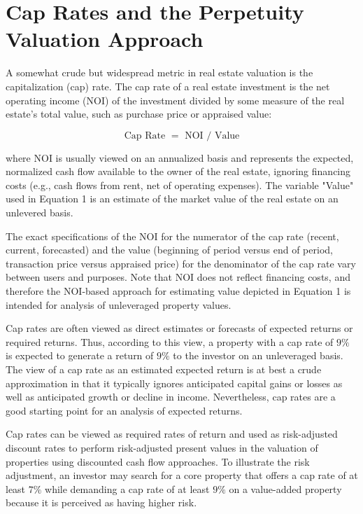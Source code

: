\documentclass[11pt]{article}
\begin{document}
\section*{Cap Rates and the Perpetuity Valuation Approach}
A somewhat crude but widespread metric in real estate valuation is the capitalization (cap) rate. The cap rate of a real estate investment is the net operating income (NOI) of the investment divided by some measure of the real estate's total value, such as purchase price or appraised value:


\begin{equation*}
\text { Cap Rate }=\text { NOI } / \text { Value } \tag{1}
\end{equation*}


where $\mathrm{NOI}$ is usually viewed on an annualized basis and represents the expected, normalized cash flow available to the owner of the real estate, ignoring financing costs (e.g., cash flows from rent, net of operating expenses). The variable "Value" used in Equation 1 is an estimate of the market value of the real estate on an unlevered basis.

The exact specifications of the NOI for the numerator of the cap rate (recent, current, forecasted) and the value (beginning of period versus end of period, transaction price versus appraised price) for the denominator of the cap rate vary between users and purposes. Note that NOI does not reflect financing costs, and therefore the $\mathrm{NOI}$-based approach for estimating value depicted in Equation 1 is intended for analysis of unleveraged property values.

Cap rates are often viewed as direct estimates or forecasts of expected returns or required returns. Thus, according to this view, a property with a cap rate of $9 \%$ is expected to generate a return of $9 \%$ to the investor on an unleveraged basis. The view of a cap rate as an estimated expected return is at best a crude approximation in that it typically ignores anticipated capital gains or losses as well as anticipated growth or decline in income. Nevertheless, cap rates are a good starting point for an analysis of expected returns.

Cap rates can be viewed as required rates of return and used as risk-adjusted discount rates to perform risk-adjusted present values in the valuation of properties using discounted cash flow approaches. To illustrate the risk adjustment, an investor may search for a core property that offers a cap rate of at least $7 \%$ while demanding a cap rate of at least $9 \%$ on a value-added property because it is perceived as having higher risk.
\end{document}
